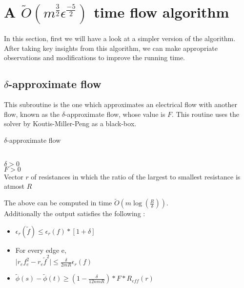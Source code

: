\documentclass[BTech]{iitmdiss}
\begin{document}
	\section{A $\widetilde{O}(m^{\frac{3}{2}}\epsilon^{\frac{-5}{2}})$ time flow algorithm}
	  In this section, first we will have a look at a simpler version of the algorithm. After taking key insights from this algorithm,
	  we can make appropriate observations and modifications to improve the running time. \\
	  \subsection{$\delta$-approximate flow}
	    This subroutine is the one which approximates an electrical flow with another flow, known as the $\delta$-approximate flow, whose value is
	    $F$. This routine uses the solver by Koutis-Miller-Peng as a black-box.
	  
	  \begin{algorithm}[H]
	   \caption{$\delta$-approximate flow}
	   \KwIn
	      {\\
	      $\delta>0$\\
	      $F>0$ \\
	      Vector $r$ of resistances in which the ratio of the largest to smallest resistance is atmost $R$ \\
	      }
	    
	  \end{algorithm}

	    The above can be computed in time $\widetilde{O}(m \log(\frac{R}{\delta}))$. \\
	    Additionally the output satisfies the following : 
	  \begin{itemize}
	  \item 
	    $\epsilon_r(\widetilde{f}) \leq \epsilon_r(f)\ast [1+\delta]$
	  \item
	    For every edge e, \\
	    
	    $\mid r_e f_e^2 - r_e \widetilde{f}^2 \mid \leq \frac{\delta}{2mR}\epsilon_r(f)$
	  \item
	    $\widetilde{\phi}(s)-\widetilde{\phi}(t) \geq (1-\frac{\delta}{12nmR})\ast F \ast R_{eff}(r)$
	  \end{itemize}
	  
\end{document}
